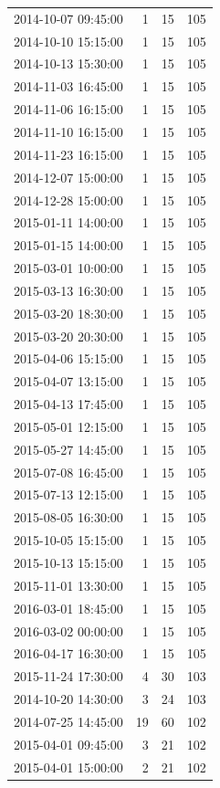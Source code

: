 \begin{tabular}{lrrr}
2014-10-07 09:45:00 & 1 & 15 & 105 \\
2014-10-10 15:15:00 & 1 & 15 & 105 \\
2014-10-13 15:30:00 & 1 & 15 & 105 \\
2014-11-03 16:45:00 & 1 & 15 & 105 \\
2014-11-06 16:15:00 & 1 & 15 & 105 \\
2014-11-10 16:15:00 & 1 & 15 & 105 \\
2014-11-23 16:15:00 & 1 & 15 & 105 \\
2014-12-07 15:00:00 & 1 & 15 & 105 \\
2014-12-28 15:00:00 & 1 & 15 & 105 \\
2015-01-11 14:00:00 & 1 & 15 & 105 \\
2015-01-15 14:00:00 & 1 & 15 & 105 \\
2015-03-01 10:00:00 & 1 & 15 & 105 \\
2015-03-13 16:30:00 & 1 & 15 & 105 \\
2015-03-20 18:30:00 & 1 & 15 & 105 \\
2015-03-20 20:30:00 & 1 & 15 & 105 \\
2015-04-06 15:15:00 & 1 & 15 & 105 \\
2015-04-07 13:15:00 & 1 & 15 & 105 \\
2015-04-13 17:45:00 & 1 & 15 & 105 \\
2015-05-01 12:15:00 & 1 & 15 & 105 \\
2015-05-27 14:45:00 & 1 & 15 & 105 \\
2015-07-08 16:45:00 & 1 & 15 & 105 \\
2015-07-13 12:15:00 & 1 & 15 & 105 \\
2015-08-05 16:30:00 & 1 & 15 & 105 \\
2015-10-05 15:15:00 & 1 & 15 & 105 \\
2015-10-13 15:15:00 & 1 & 15 & 105 \\
2015-11-01 13:30:00 & 1 & 15 & 105 \\
2016-03-01 18:45:00 & 1 & 15 & 105 \\
2016-03-02 00:00:00 & 1 & 15 & 105 \\
2016-04-17 16:30:00 & 1 & 15 & 105 \\
2015-11-24 17:30:00 & 4 & 30 & 103 \\
2014-10-20 14:30:00 & 3 & 24 & 103 \\
2014-07-25 14:45:00 & 19 & 60 & 102 \\
2015-04-01 09:45:00 & 3 & 21 & 102 \\
2015-04-01 15:00:00 & 2 & 21 & 102 \\

\end{tabular}
